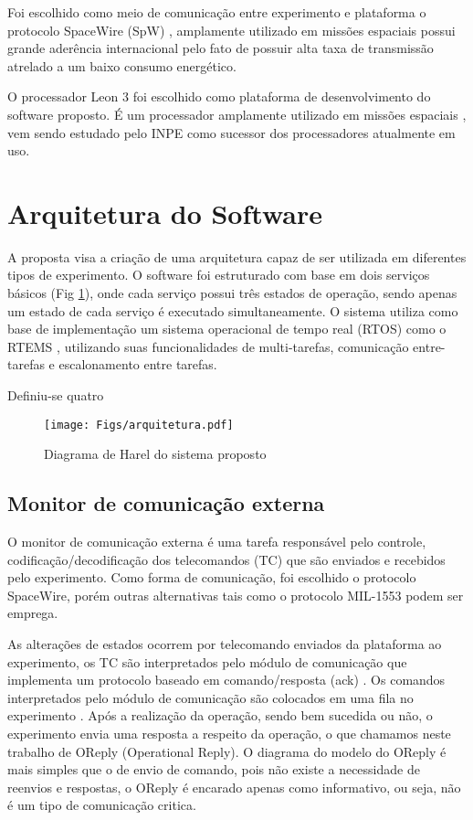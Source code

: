 \documentclass[journal,a4paper,oneside,twocolumn]{IEEEtran}
\begin{document}
	 Foi escolhido como meio de comunicação entre experimento e plataforma o protocolo SpaceWire (SpW) \cite{SpW}, amplamente utilizado em missões espaciais possui grande aderência internacional pelo fato de possuir alta taxa de transmissão atrelado a um baixo consumo energético. 
	 
	O processador Leon 3 \cite{LEON3} foi escolhido como plataforma de desenvolvimento do software proposto. É um processador amplamente utilizado em missões espaciais \cite{abbasitabar2012susceptibility}, vem sendo estudado pelo INPE como  sucessor dos processadores atualmente em uso.
	
\section{Arquitetura do Software}
		
	A proposta visa a criação de uma arquitetura capaz de ser utilizada em diferentes tipos de experimento.   	
	O software foi estruturado com base em dois serviços básicos (Fig \ref{fig:arq}), onde cada serviço possui três estados de operação, sendo apenas um estado de cada serviço é executado simultaneamente. O sistema utiliza como base de implementação um sistema operacional de tempo real (RTOS) como o RTEMS \cite{zhang2010research}, utilizando suas funcionalidades de multi-tarefas, comunicação entre-tarefas e escalonamento entre tarefas.
	
	Definiu-se quatro 
	
	\begin{figure}[!t]
	\centering
	\texttt{[image: Figs/arquitetura.pdf]}
	\caption{Diagrama de Harel do sistema  proposto}
	\label{fig:arq}
	\end{figure}
	
\subsection{Monitor de comunicação externa}
	
	O monitor de comunicação externa é uma tarefa responsável pelo controle, codificação/decodificação dos telecomandos (TC) que são enviados e recebidos pelo experimento. Como forma de comunicação, foi escolhido o protocolo SpaceWire, porém outras alternativas tais como o protocolo MIL-1553 \cite{mil1553} podem ser emprega.
	
	As alterações de estados ocorrem por telecomando enviados da plataforma ao experimento,  os TC são interpretados pelo módulo de comunicação que implementa um protocolo baseado em comando/resposta (ack) . Os comandos interpretados pelo módulo de comunicação são colocados em uma fila no experimento . Após a	realização da operação, sendo bem sucedida ou não, o experimento envia uma resposta a	respeito da operação, o que chamamos neste trabalho de OReply (Operational Reply). O diagrama do modelo do OReply é mais simples que o de envio de comando, pois não existe a	necessidade de reenvios e respostas, o OReply é encarado apenas como informativo, ou seja,	não é um tipo de comunicação critica.
	
\end{document}
